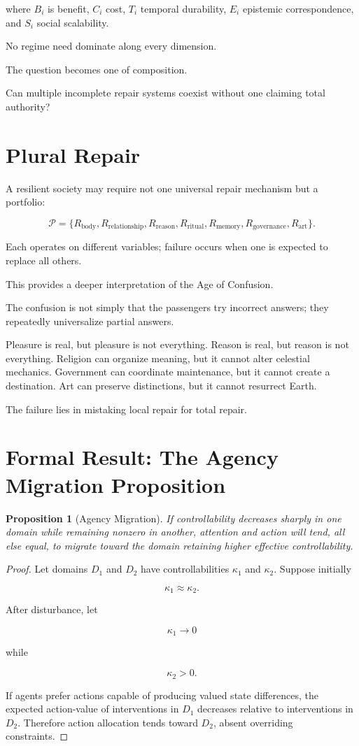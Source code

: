 \documentclass[11pt,oneside]{book}
\newtheorem{proposition}[theorem]{Proposition}
\theoremstyle{definition}
\theoremstyle{remark}
\begin{document}
where \(B_i\) is benefit, \(C_i\) cost, \(T_i\) temporal durability, \(E_i\) epistemic correspondence, and \(S_i\) social scalability.

No regime need dominate along every dimension.

The question becomes one of composition.

Can multiple incomplete repair systems coexist without one claiming total authority?

\section{Plural Repair}

A resilient society may require not one universal repair mechanism but a portfolio:

\[
\mathcal P
=
\{
R_{\mathrm{body}},
R_{\mathrm{relationship}},
R_{\mathrm{reason}},
R_{\mathrm{ritual}},
R_{\mathrm{memory}},
R_{\mathrm{governance}},
R_{\mathrm{art}}
\}.
\]

Each operates on different variables; failure occurs when one is expected to replace all others.

This provides a deeper interpretation of the Age of Confusion.

The confusion is not simply that the passengers try incorrect answers; they repeatedly universalize partial answers.

Pleasure is real, but pleasure is not everything. Reason is real, but reason is not everything. Religion can organize meaning, but it cannot alter celestial mechanics. Government can coordinate maintenance, but it cannot create a destination. Art can preserve distinctions, but it cannot resurrect Earth.

The failure lies in mistaking local repair for total repair.

\section{Formal Result: The Agency Migration Proposition}

\begin{proposition}[Agency Migration]
If controllability decreases sharply in one domain while remaining nonzero in another, attention and action will tend, all else equal, to migrate toward the domain retaining higher effective controllability.
\end{proposition}

\begin{proof}
Let domains \(D_1\) and \(D_2\) have controllabilities \(\kappa_1\) and \(\kappa_2\). Suppose initially

\[
\kappa_1\approx\kappa_2.
\]

After disturbance, let

\[
\kappa_1\rightarrow0
\]

while

\[
\kappa_2>0.
\]

If agents prefer actions capable of producing valued state differences, the expected action-value of interventions in \(D_1\) decreases relative to interventions in \(D_2\). Therefore action allocation tends toward \(D_2\), absent overriding constraints.
\end{proof}
\end{document}

